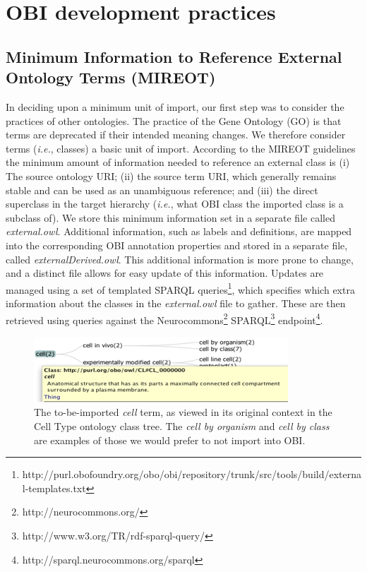 \documentclass{elsart}       %
\begin{document}
\section{OBI development practices}


\subsection{Minimum Information to Reference External Ontology Terms (MIREOT)}

In deciding upon a minimum unit of import, our first step was to consider the practices of other ontologies.
The practice of the Gene Ontology (GO)\cite{go} is that terms are deprecated if their intended meaning changes\cite{deprecated}.
We therefore consider terms (\emph{i.e.}, classes) a basic unit of import.
According to the MIREOT guidelines the minimum amount of information needed to reference an external class is (i) The source ontology URI; (ii) the source term URI, which generally remains stable and can be used as an unambiguous reference; and (iii) the direct superclass in the target hierarchy (\emph{i.e.}, what OBI class the imported class is a subclass of).
We store this minimum information set in a separate file called \emph{external.owl}. 
Additional information, such as labels and definitions, are mapped into the corresponding OBI annotation properties and stored in a separate file, called \emph{externalDerived.owl}. This additional information is more prone to change, and a distinct file allows for easy update of this information.
Updates are managed using a set of templated SPARQL queries\footnote{http://purl.obofoundry.org/obo/obi/repository/trunk/src/tools/build/external-templates.txt}, which specifies which extra information about the classes in the \emph{external.owl} file to gather.
These are then retrieved using queries against the Neurocommons\footnote{http://neurocommons.org/} SPARQL\footnote{http://www.w3.org/TR/rdf-sparql-query/} endpoint\footnote{http://sparql.neurocommons.org/sparql}.

\begin{figure}[t]
\centering \includegraphics*[width=1\columnwidth]{cell}
\caption{The to-be-imported \emph{cell} term, as viewed in its original context in the Cell Type ontology class tree. The \emph{cell by organism} and \emph{cell by class} are examples of those we would prefer to not import into OBI.}
\label{fig:cell}
\end{figure}
\end{document}
